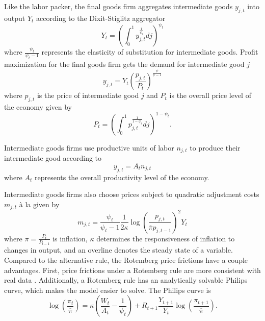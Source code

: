 Like the labor packer, the final goods firm aggregates intermediate goods $y_{j, t}$ into output $Y_t$ according to the Dixit-Stiglitz aggregator
\begin{equation*}
    Y_t = \left( \int_0^1 y_{j, t}^\frac{1}{\psi_t} dj \right)^{\psi_t}
\end{equation*}
where $\frac{\psi_t}{\psi_t - 1}$ represents the elasticity of substitution for intermediate goods. Profit maximization for the final goods firm gets the demand for intermediate good $j$
\begin{equation*}
    y_{j, t} = Y_t \left(\frac{p_{j, t}}{P_t}\right)^\frac{\psi}{\psi - 1}
\end{equation*}
where $p_{j, t}$ is the price of intermediate good $j$ and $P_t$ is the overall price level of the economy given by
\begin{equation*}
    P_t = \left(\int_0^1 p_{j, t}^\frac{1}{1 - \psi_t} dj \right)^{1 - \psi_t}.
\end{equation*}

Intermediate goods firms use productive units of labor $n_{j, t}$ to produce their intermediate good according to
\begin{equation*}
    y_{j, t} = A_t n_{j, t}
\end{equation*}
where $A_t$ represents the overall productivity level of the economy.

Intermediate goods firms also choose prices subject to quadratic adjustment costs $m_{j, t}$ à la \textcite{rotemberg1982sticky} given by
\begin{equation*}
    m_{j, t} = \frac{\psi_t}{\psi_t - 1} \frac{1}{2 \kappa} \log\left(\frac{p_{j, t}}{\overline{\pi} p_{j, t - 1}}\right)^2 Y_t
\end{equation*}
where $\pi = \frac{P_t}{P_{t - 1}}$ is inflation, $\kappa$ determines the responsiveness of inflation to changes in output, and an overline denotes the steady state of a variable. Compared to the alternative \textcite{calvo1983staggered} rule, the Rotemberg price frictions have a couple advantages. First, price frictions under a Rotemberg rule are more consistent with real data \autocite{richter2016rotemberg}. Additionally, a Rotemberg rule has an analytically solvable Philips curve, which makes the model easier to solve. The Philips curve is
\begin{equation*}
    \log \left(\frac{\pi_t}{\overline{\pi}}\right) = \kappa \left(\frac{W_t}{A_t} - \frac{1}{\psi_t}\right) + R_{t+1} \frac{Y_{t+1}}{Y_t} \log\left(\frac{\pi_{t+1}}{\overline{\pi}}\right).
\end{equation*}

